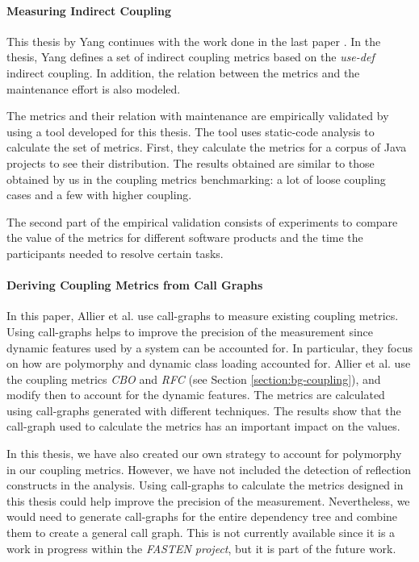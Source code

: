 \paragraph{Measuring Indirect Coupling \cite{Yang2010}}

This thesis by Yang continues with the work done in the last paper \cite{yang2005detecting}. In the thesis, Yang defines a set of indirect coupling metrics based on the \textit{use-def} indirect coupling. In addition, the relation between the metrics and the maintenance effort is also modeled.

The metrics and their relation with maintenance are empirically validated by using a tool developed for this thesis. The tool uses static-code analysis to calculate the set of metrics. First, they calculate the metrics for a corpus of Java projects to see their distribution. The results obtained are similar to those obtained by us in the coupling metrics benchmarking: a lot of loose coupling cases and a few with higher coupling.

The second part of the empirical validation consists of experiments to compare the value of the metrics for different software products and the time the participants needed to resolve certain tasks.

\paragraph{Deriving Coupling Metrics from Call Graphs \cite{Allier2010}}

In this paper, Allier et al. use call-graphs to measure existing coupling metrics. Using call-graphs helps to improve the precision of the measurement since dynamic features used by a system can be accounted for. In particular, they focus on how are polymorphy and dynamic class loading accounted for. Allier et al. use the coupling metrics \textit{CBO} and \textit{RFC} (see Section \ref{section:bg-coupling}), and modify then to account for the dynamic features. The metrics are calculated using call-graphs generated with different techniques. The results show that the call-graph used to calculate the metrics has an important impact on the values.

In this thesis, we have also created our own strategy to account for polymorphy in our coupling metrics. However, we have not included the detection of reflection constructs in the analysis. Using call-graphs to calculate the metrics designed in this thesis could help improve the precision of the measurement. Nevertheless, we would need to generate call-graphs for the entire dependency tree and combine them to create a general call graph. This is not currently available since it is a work in progress within the \textit{FASTEN project}, but it is part of the future work.


